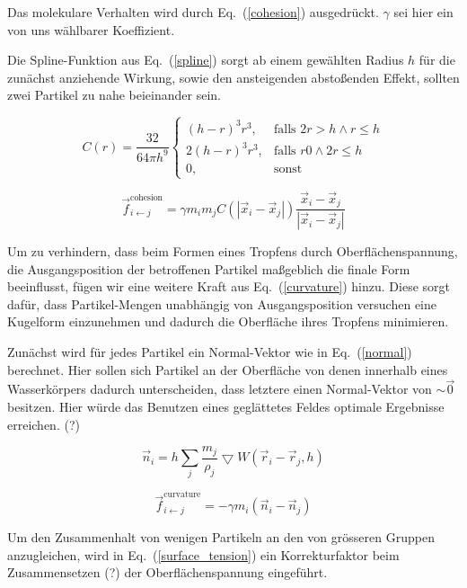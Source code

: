 \documentclass[a4paper]{paper}
\renewcommand{\eqref}[1]{Eq.~(\ref{#1})}
\begin{document}
Das molekulare Verhalten wird durch \eqref{cohesion} ausgedrückt. $\gamma$ sei hier ein von uns wählbarer Koeffizient.

Die Spline-Funktion aus \eqref{spline} sorgt ab einem gewählten Radius $h$ für die zunächst anziehende Wirkung, sowie den ansteigenden abstoßenden Effekt, sollten zwei Partikel zu nahe beieinander sein.

\begin{equation}
\label{spline}
C(r) = \frac{32}{64 \pi h^9}
\begin{cases}
(h-r)^3r^3,  &\text{falls }  2r > h \land r \leq h\\
2(h-r)^3r^3, &\text{falls } r  0 \land 2r \leq h\\
0,&\text{sonst}  
\end{cases}
\end{equation}



\begin{equation}
\label{cohesion}
\vec{f}_{i\leftarrow j}^{\text{cohesion}} = \gamma m_{i} m_{j} C(|\vec{x}_i - \vec{x}_j|)\frac{\vec{x}_i - \vec{x}_j}{|\vec{x}_i - \vec{x}_j|}
\end{equation}


Um zu verhindern, dass beim Formen eines Tropfens durch Oberflächenspannung, die Ausgangsposition der betroffenen Partikel maßgeblich die finale Form beeinflusst, fügen wir eine weitere Kraft aus \eqref{curvature} hinzu.
Diese sorgt dafür, dass Partikel-Mengen unabhängig von Ausgangsposition versuchen eine Kugelform einzunehmen und dadurch die Oberfläche ihres Tropfens minimieren.

Zunächst wird für jedes Partikel ein Normal-Vektor wie in \eqref{normal} berechnet. Hier sollen sich Partikel an der Oberfläche von denen innerhalb eines Wasserkörpers dadurch unterscheiden, dass letztere einen Normal-Vektor von $\sim \vec{0}$ besitzen. Hier würde das Benutzen eines geglättetes Feldes optimale Ergebnisse erreichen. (?)

\begin{equation}
\label{normal}
\vec{n}_{i} = h\sum_{j}\frac{m_{j}}{\rho_{j}}\bigtriangledown W (\vec{r}_{i}-\vec{r}_{j},h)
\end{equation}

\begin{equation}
\label{curvature}
\vec{f}_{i\leftarrow j}^{\text{curvature}} = -\gamma m_{i}(\vec{n}_i - \vec{n}_j)
\end{equation}

Um den Zusammenhalt von wenigen Partikeln an den von grösseren Gruppen anzugleichen, wird in \eqref{surface_tension} ein Korrekturfaktor beim Zusammensetzen (?) der Oberflächenspannung eingeführt.
\end{document}
